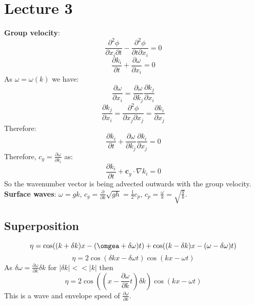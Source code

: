 \documentclass{article}
\begin{document}
\section{Lecture 3}
\textbf{Group velocity}:
$$
\frac{\partial^2 \phi}{\partial x_i \partial t} - \frac{\partial^2 \phi}{\partial t \partial x_i} = 0
$$
$$
\frac{\partial k_i}{\partial t} + \frac{\partial \omega}{\partial x_i} = 0
$$
As $\omega = \omega(k)$ we have:
$$
\frac{\partial \omega}{\partial x_i} = \frac{\partial \omega}{\partial k_j} \frac{\partial k_j}{\partial x_i} 
$$
$$
\frac{\partial k_j}{\partial x_i} = \frac{\partial ^2 \phi}{\partial x_j \partial x_j} = \frac{ \partial k_i}{\partial x_j}
$$
Therefore:
$$
\frac{\partial k_i}{\partial t} + \frac{\partial \omega}{\partial k_j} \frac{\partial k_i}{\partial x_j} = 0
$$
Therefore, $c_g = \frac{\partial \omega}{\partial k_i}$ as:
$$
\frac{\partial k_i}{\partial t} + \bm c_g \cdot \nabla k_i  = 0
$$
So the wavenumber vector is being advected outwards with the group velocity.\\
\textbf{Surface waves}: $\omega = gk$, $c_g = \frac{ \partial}{\partial k} \sqrt{ gh} = \frac{1}{2} c_p$, $c_p = \frac{\omega}{k} = \sqrt{ \frac{g}{k}}$.
\subsection{Superposition}
$$
\eta = \cos( (k+ \delta k) x - (\omgea + \delta \omega)t) + \cos ((k- \delta k) x - (\omega - \delta \omega)t)
$$
$$
\eta = 2 \cos( \delta k x - \delta \omega t) \cos (kx - \omega t)
$$
As $\delta \omega = \frac{\partial \omega}{\partial k} \delta k$ for $|\delta k| << |k|$ then
$$
\eta = 2 \cos( (x- \frac{\partial \omega}{\partial k} t) \delta k) \cos (k x - \omega t)
$$
This is a wave and envelope speed of $\frac{\partial \omega}{\partial k}$.
\end{document}
